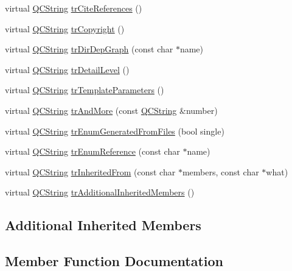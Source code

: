 \begin{DoxyCompactItemize}
\item 
virtual \mbox{\hyperlink{class_q_c_string}{Q\+C\+String}} \mbox{\hyperlink{class_translator_polish_a3b236a99b6b4fb9dc86338841d13236a}{tr\+Cite\+References}} ()
\item 
virtual \mbox{\hyperlink{class_q_c_string}{Q\+C\+String}} \mbox{\hyperlink{class_translator_polish_a153f56dc96f1f3fa3caccf30a556ba04}{tr\+Copyright}} ()
\item 
virtual \mbox{\hyperlink{class_q_c_string}{Q\+C\+String}} \mbox{\hyperlink{class_translator_polish_a7b093f74dfcc7c465737d62c02b91ba3}{tr\+Dir\+Dep\+Graph}} (const char $\ast$name)
\item 
virtual \mbox{\hyperlink{class_q_c_string}{Q\+C\+String}} \mbox{\hyperlink{class_translator_polish_a68865adf71b369f41766250b65e9fbf3}{tr\+Detail\+Level}} ()
\item 
virtual \mbox{\hyperlink{class_q_c_string}{Q\+C\+String}} \mbox{\hyperlink{class_translator_polish_a662e8766ea79fbb038bea786067d121c}{tr\+Template\+Parameters}} ()
\item 
virtual \mbox{\hyperlink{class_q_c_string}{Q\+C\+String}} \mbox{\hyperlink{class_translator_polish_a7c68aacd10a2ac5583af8e22f9da94b1}{tr\+And\+More}} (const \mbox{\hyperlink{class_q_c_string}{Q\+C\+String}} \&number)
\item 
virtual \mbox{\hyperlink{class_q_c_string}{Q\+C\+String}} \mbox{\hyperlink{class_translator_polish_aa65ca369d0edfce42f4ec052b9f78ab7}{tr\+Enum\+Generated\+From\+Files}} (bool single)
\item 
virtual \mbox{\hyperlink{class_q_c_string}{Q\+C\+String}} \mbox{\hyperlink{class_translator_polish_a12ea60adab1b378ed45ad12b34fa5266}{tr\+Enum\+Reference}} (const char $\ast$name)
\item 
virtual \mbox{\hyperlink{class_q_c_string}{Q\+C\+String}} \mbox{\hyperlink{class_translator_polish_a38f7cb734efe1c3285ca306ccd6207b5}{tr\+Inherited\+From}} (const char $\ast$members, const char $\ast$what)
\item 
virtual \mbox{\hyperlink{class_q_c_string}{Q\+C\+String}} \mbox{\hyperlink{class_translator_polish_a0561314fe0b9d59cb731d64e8ed55de2}{tr\+Additional\+Inherited\+Members}} ()
\end{DoxyCompactItemize}
\subsection*{Additional Inherited Members}


\subsection{Member Function Documentation}
\mbox{\label{class_translator_polish_a75c2e08b70d1be5ca4c1b6f9951def03}} 
